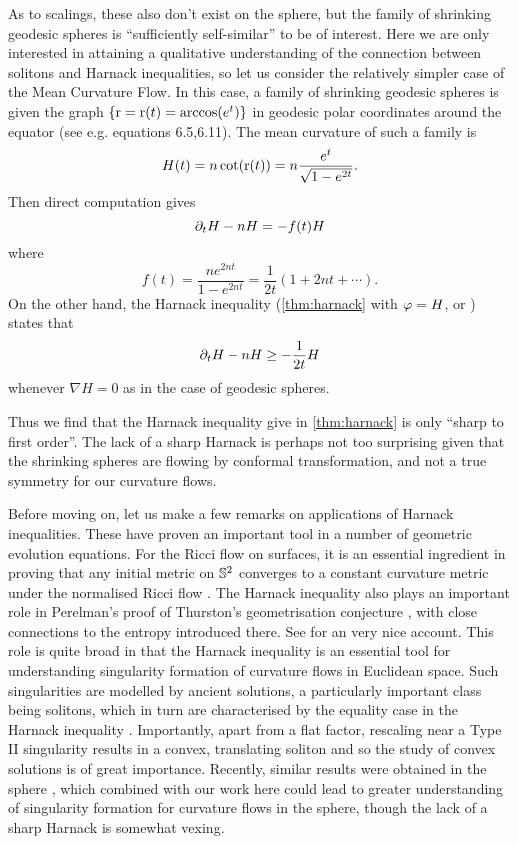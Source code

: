 \documentclass{amsart}
\begin{document}
As to scalings, these also don't exist on the sphere, but the family of shrinking geodesic spheres is ``sufficiently self-similar'' to be of interest. Here we are only interested in attaining a qualitative understanding of the connection between solitons and Harnack inequalities, so let us consider the relatively simpler case of the Mean Curvature Flow. In this case, a family of shrinking geodesic spheres is given the graph \(\{\radialdistance = \radialdistance(t) = \arccos(e^{t})\}\) in geodesic polar coordinates around the equator (see e.g. \cite{Gerhardt:/2015} equations 6.5,6.11). The mean curvature of such a family is
\[
H(t) = n\cot(\radialdistance(t)) = n\frac{e^{t}}{\sqrt{1 - e^{2t}}}.
\]
Then direct computation gives
\[
\del_t H - n H = -f(t) H
\]
where
\[
f(t) = \frac{n e^{2nt}}{1 - e^{2nt}} = \frac{1}{2t}(1 + 2nt + \cdots).
\]
On the other hand, the Harnack inequality (\cref{thm:harnack} with \(\p = H\), or \cite{IvakiBryan:08/2015}) states that
\[
\del_t H - n H \geq - \frac{1}{2t} H
\]
whenever \(\nabla H = 0\) as in the case of geodesic spheres.

Thus we find that the Harnack inequality give in \cref{thm:harnack} is only ``sharp to first order''. The lack of a sharp Harnack is perhaps not too surprising given that the shrinking spheres are flowing by conformal transformation, and not a true symmetry for our curvature flows.

Before moving on, let us make a few remarks on applications of Harnack inequalities. These have proven an important tool in a number of geometric evolution equations. For the Ricci flow on surfaces, it is an essential ingredient in proving that any initial metric on \(\S^2\) converges to a constant curvature metric under the normalised Ricci flow \cite{MR954419,MR1094458}. The Harnack inequality also plays an important role in Perelman's proof of Thurston's geometrisation conjecture \cite{arXiv0211159}, with close connections to the entropy introduced there. See \cite{MR2251315} for an very nice account. This role is quite broad in that the Harnack inequality is an essential tool for understanding singularity formation of curvature flows in Euclidean space. Such singularities are modelled by ancient solutions, a particularly important class being solitons, which in turn are characterised by the equality case in the Harnack inequality \cite{MR1666878}. Importantly, apart from a flat factor, rescaling near a Type II singularity results in a convex, translating soliton and so the study of convex solutions is of great importance. Recently, similar results were obtained in the sphere \cite{MR3335392}, which combined with our work here could lead to greater understanding of singularity formation for curvature flows in the sphere, though the lack of a sharp Harnack is somewhat vexing.
\end{document}

